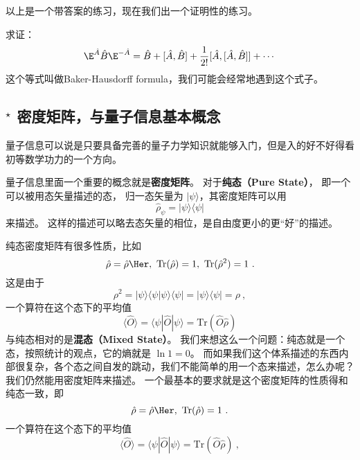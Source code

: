以上是一个带答案的练习，现在我们出一个证明性的练习。

\begin{exercise}{}
求证：
\begin{equation}
\E^{\hat A}\hat B \E^{-\hat A} = \hat{B} + [\hat A,\hat B] + \frac{1}{2!} [\hat A, [\hat A,\hat B]] + \cdots
\end{equation}
这个等式叫做Baker-Hausdorff formula，我们可能会经常地遇到这个式子。
\end{exercise}

\subsection{$^\star$ 密度矩阵，与量子信息基本概念}

量子信息可以说是只要具备完善的量子力学知识就能够入门，但是入的好不好得看初等数学功力的一个方向。

量子信息里面一个重要的概念就是\textbf{密度矩阵}。 对于\textbf{纯态（Pure State）}， 即一个可以被用态矢量描述的态， 归一态矢量为 $|\psi\rangle$，其密度矩阵可以用
\begin{equation}
\hat\rho_{\psi} = |\psi\rangle\langle\psi|
\end{equation}
来描述。 这样的描述可以略去态矢量的相位，是自由度更小的更“好”的描述。

纯态密度矩阵有很多性质，比如
\begin{equation}
\hat\rho = \hat\rho\Her,\ \text{Tr}(\hat\rho) = 1,\ \text{Tr}(\hat\rho^2) = 1~.
\end{equation}
这是由于
\begin{equation}
\rho^2 = |\psi\rangle\langle\psi|\psi\rangle\langle\psi| = |\psi\rangle\langle\psi| = \rho~,
\end{equation}
一个算符在这个态下的平均值
\begin{equation}
\langle\hat O\rangle = \langle\psi|\hat O|\psi\rangle = \text{Tr}(\hat O\hat \rho)
\end{equation}
与纯态相对的是\textbf{混态（Mixed State）}。 我们来想这么一个问题：纯态就是一个态，按照统计的观点，它的熵就是 $\ln 1 = 0$。 而如果我们这个体系描述的东西内部很复杂，各个态之间自发的跳动，我们不能简单的用一个态来描述，怎么办呢？我们仍然能用密度矩阵来描述。 一个最基本的要求就是这个密度矩阵的性质得和纯态一致，即
\begin{equation}
\hat\rho = \hat\rho\Her,\ \text{Tr}(\hat\rho) = 1~.
\end{equation}
一个算符在这个态下的平均值
\begin{equation}
\langle\hat O\rangle = \langle\psi|\hat O|\psi\rangle = \text{Tr}(\hat O\hat \rho)~,
\end{equation}

